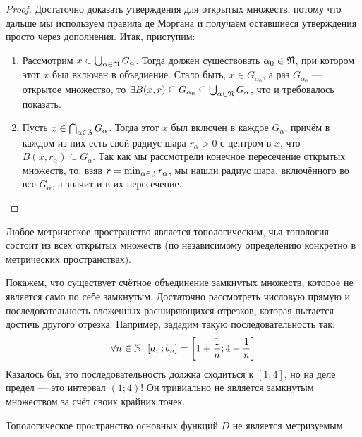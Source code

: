 \begin{proof}
	Достаточно доказать утверждения для открытых множеств, потому что дальше мы используем правила де Моргана и получаем оставшиеся утверждения просто через дополнения. Итак, приступим:
	\begin{enumerate}
		\item Рассмотрим $x \in \bigcup_{\alpha \in \mathfrak{N}} G_\alpha$. Тогда должен существовать $\alpha_0 \in \mathfrak{N}$, при котором этот $x$ был включен в объедиение. Стало быть, $x \in G_{\alpha_0}$, а раз $G_{\alpha_0}$ --- открытое множество, то $\exists B(x, r) \subseteq G_{\alpha_0} \subseteq \bigcup_{\alpha \in \mathfrak{N}} G_\alpha$, что и требовалось показать.
		
		\item Пусть $x \in \bigcap_{\alpha \in \mathfrak{Z}} G_\alpha$. Тогда этот $x$ был включен в каждое $G_\alpha$, причём в каждом из них есть свой радиус шара $r_\alpha > 0$ с центром в $x$, что $B(x, r_\alpha) \subseteq G_\alpha$. Так как мы рассмотрели конечное пересечение открытых множеств, то, взяв $r = \min_{\alpha \in \mathfrak{Z}} r_\alpha$, мы нашли радиус шара, включённого во все $G_\alpha$, а значит и в их пересечение.
	\end{enumerate}
\end{proof}

\begin{corollary}
	Любое метрическое пространство является топологическим, чья топология состоит из всех открытых множеств (по независимому определению конкретно в метрических пространствах).
\end{corollary}

\begin{example}
	Покажем, что существует счётное объединение замкнутых множеств, которое не является само по себе замкнутым. Достаточно рассмотреть числовую прямую и последовательность вложенных расширяющихся отрезков, которая пытается достичь другого отрезка. Например, зададим такую последовательность так:
	\[
		\forall n \in \N\ \ [a_n; b_n] = \sbr{1 + \frac{1}{n}; 4 - \frac{1}{n}}
	\]
	Казалось бы, это последовательность должна сходиться к $[1; 4]$, но на деле предел --- это интервал $(1; 4)$! Он тривиально не является замкнутым множеством за счёт своих крайних точек.
\end{example}

\begin{exercise}
	Топологическое проcтранство основных функций $D$ не является метризуемым
\end{exercise}

